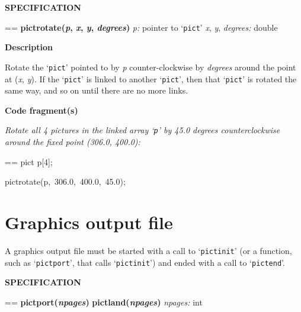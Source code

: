 \documentclass{book}
\makeatletter
\newcommand\Texinfocommandstyletextvar[1]{{\normalfont{}\textsl{#1}}}%
\newenvironment{Texinfopreformatted}{%
  \par\GNUTobeylines\obeyspaces\frenchspacing\parskip=\z@\parindent=\z@}{}
{\catcode`\^^M=13 \gdef\GNUTobeylines{\catcode`\^^M=13 \def^^M{\null\par}}}
\newenvironment{Texinfoindented}{\begin{list}{}{}\item\relax}{\end{list}}
\renewcommand{\_}{\Texinfounderscore\discretionary{}{}{}}
\makeatother
\begin{document}
\noindent{}\textbf{SPECIFICATION}
\begin{Texinfoindented}
\begin{Texinfopreformatted}%
\textbf{pict\_rotate(\Texinfocommandstyletextvar{p}, \Texinfocommandstyletextvar{x}, \Texinfocommandstyletextvar{y}, \Texinfocommandstyletextvar{degrees})}
\Texinfocommandstyletextvar{p:} pointer to `\texttt{pict}'
\Texinfocommandstyletextvar{x}, \Texinfocommandstyletextvar{y}, \Texinfocommandstyletextvar{degrees:} double
\end{Texinfopreformatted}
\end{Texinfoindented}
%
%
%

\noindent{}\textbf{Description}

Rotate the `\texttt{pict}' pointed to by \Texinfocommandstyletextvar{p} counter-clockwise by
\Texinfocommandstyletextvar{degrees} around the point at (\Texinfocommandstyletextvar{x}, \Texinfocommandstyletextvar{y}).
If the `\texttt{pict}' is linked to another `\texttt{pict}', then that `\texttt{pict}' is rotated the same
way, and so on until there are no more links.

\noindent{}\textbf{Code fragment(s)}

\emph{Rotate all 4 pictures in the linked array
`\texttt{p}' by 45.0 degrees counterclockwise
around the fixed point (306.0, 400.0):}
\begin{Texinfoindented}
\begin{Texinfopreformatted}%
\ttfamily pict p[4];

pict\_rotate(p,\ 306.0,\ 400.0,\ 45.0);
\end{Texinfopreformatted}
\end{Texinfoindented}

\section{{Graphics output file}}
\label{anchor:Graphics-output-file}%

A graphics output file must be started with a call to `\texttt{pict\_init}'
(or a function, such as `\texttt{pict\_port}', that calls `\texttt{pict\_init}')
and ended with a call to `\texttt{pict\_end}'.

\noindent{}\textbf{SPECIFICATION}
\begin{Texinfoindented}
\begin{Texinfopreformatted}%
\textbf{pict\_port(\Texinfocommandstyletextvar{npages})}
\textbf{pict\_land(\Texinfocommandstyletextvar{npages})}
\Texinfocommandstyletextvar{npages:} int
\end{Texinfopreformatted}
\end{Texinfoindented}
%
%
%
%
%
%
\end{document}
